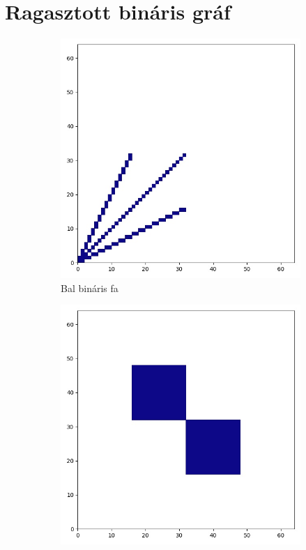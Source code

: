 \section{Ragasztott bináris gráf}

\begin{figure}[H]
  \centering
  \begin{subfigure}{.3\linewidth}
    \centering
    \includegraphics[width=\linewidth]{./figures/ragasztott_binaris/subgraph_00.jpg}
    \caption{Bal bináris fa}
  \end{subfigure}
  \begin{subfigure}{.3\linewidth}
    \centering
    \includegraphics[width=\linewidth]{./figures/ragasztott_binaris/subgraph_02.jpg}

\end{subfigure}
\end{figure}

